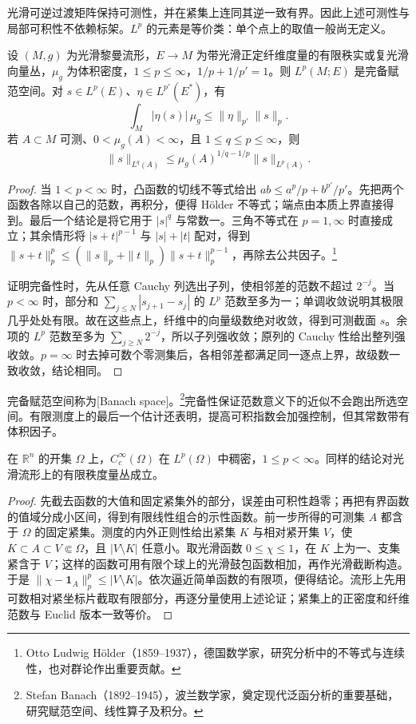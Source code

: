 光滑可逆过渡矩阵保持可测性，并在紧集上连同其逆一致有界。因此上述可测性与局部可积性不依赖标架。\(L^p\) 的元素是等价类：单个点上的取值一般尚无定义。

\begin{proposition}\label{g3:prop:lp-basic}
	设 \((M,g)\) 为光滑黎曼流形，\(E\to M\) 为带光滑正定纤维度量的有限秩实或复光滑向量丛，\(\mu_g\) 为体积密度，\(1\le p\le\infty\)，\(1/p+1/p'=1\)。则 \(L^p(M;E)\) 是完备赋范空间。对 \(s\in L^p(E)\)、\(\eta\in L^{p'}(E^*)\)，有
	\[
		\int_M|\eta(s)|\,\mu_g\le\|\eta\|_{p'}\|s\|_p.
	\]
	若 \(A\subset M\) 可测、\(0<\mu_g(A)<\infty\)，且 \(1\le q\le p\le\infty\)，则
	\[
		\|s\|_{L^q(A)}\le\mu_g(A)^{1/q-1/p}\|s\|_{L^p(A)}.
	\]
\end{proposition}
\begin{proof}
	当 \(1<p<\infty\) 时，凸函数的切线不等式给出 \(ab\le a^p/p+b^{p'}/p'\)。先把两个函数各除以自己的范数，再积分，便得 Hölder 不等式；端点由本质上界直接得到。最后一个结论是将它用于 \(|s|^q\) 与常数一。三角不等式在 \(p=1,\infty\) 时直接成立；其余情形将 \(|s+t|^{p-1}\) 与 \(|s|+|t|\) 配对，得到 \(\|s+t\|_p^p\le(\|s\|_p+\|t\|_p)\|s+t\|_p^{p-1}\)，再除去公共因子。\footnote{Otto Ludwig Hölder（1859--1937），德国数学家，研究分析中的不等式与连续性，也对群论作出重要贡献。}

	证明完备性时，先从任意 Cauchy 列选出子列，使相邻差的范数不超过 \(2^{-j}\)。当 \(p<\infty\) 时，部分和 \(\sum_{j\le N}|s_{j+1}-s_j|\) 的 \(L^p\) 范数至多为一；单调收敛说明其极限几乎处处有限。故在这些点上，纤维中的向量级数绝对收敛，得到可测截面 \(s\)。余项的 \(L^p\) 范数至多为 \(\sum_{j\ge N}2^{-j}\)，所以子列强收敛；原列的 Cauchy 性给出整列强收敛。\(p=\infty\) 时去掉可数个零测集后，各相邻差都满足同一逐点上界，故级数一致收敛，结论相同。
\end{proof}

完备赋范空间称为[Banach space]。\footnote{Stefan Banach（1892--1945），波兰数学家，奠定现代泛函分析的重要基础，研究赋范空间、线性算子及积分。}完备性保证范数意义下的近似不会跑出所选空间。有限测度上的最后一个估计还表明，提高可积指数会加强控制，但其常数带有体积因子。

\begin{lemma}\label{g3:lem:lp-smooth-density}
	在 \(\mathbb R^n\) 的开集 \(\Omega\) 上，\(C_c^\infty(\Omega)\) 在 \(L^p(\Omega)\) 中稠密，\(1\le p<\infty\)。同样的结论对光滑流形上的有限秩度量丛成立。
\end{lemma}
\begin{proof}
	先截去函数的大值和固定紧集外的部分，误差由可积性趋零；再把有界函数的值域分成小区间，得到有限线性组合的示性函数。前一步所得的可测集 \(A\) 都含于 \(\Omega\) 的固定紧集。测度的内外正则性给出紧集 \(K\) 与相对紧开集 \(V\)，使 \(K\subset A\subset V\Subset\Omega\)，且 \(|V\setminus K|\) 任意小。取光滑函数 \(0\le\chi\le1\)，在 \(K\) 上为一、支集紧含于 \(V\)；这样的函数可用有限个球上的光滑鼓包函数相加，再作光滑截断构造。于是 \(\|\chi-\mathbf1_A\|_p^p\le|V\setminus K|\)。依次逼近简单函数的有限项，便得结论。流形上先用可数相对紧坐标片截取有限部分，再逐分量使用上述论证；紧集上的正密度和纤维范数与 Euclid 版本一致等价。
\end{proof}

